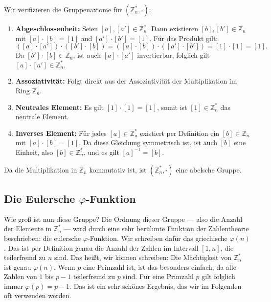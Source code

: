 \begin{math-stroke}

\begin{short-proof}
Wir verifizieren die Gruppenaxiome für $(\mathbb{Z}_n^*, \cdot)$:
\begin{enumerate}[label=\textbf{(\arabic*)}]
    \item \textbf{Abgeschlossenheit:} Seien $[a], [a'] \in \mathbb{Z}_n^*$. Dann existieren $[b], [b'] \in \mathbb{Z}_n$ mit $[a] \cdot [b] = [1]$ and $[a'] \cdot [b'] = [1]$. Für das Produkt gilt:
    \[
    ([a] \cdot [a']) \cdot ([b'] \cdot [b]) = ([a] \cdot [b]) \cdot ([a'] \cdot [b']) = [1] \cdot [1] = [1].
    \]
    Da $[b'] \cdot [b] \in \mathbb{Z}_n$, ist auch $[a] \cdot [a']$ invertierbar, folglich gilt $[a] \cdot [a'] \in \mathbb{Z}_n^*$.
    \item \textbf{Assoziativität:} Folgt direkt aus der Assoziativität der Multiplikation im Ring $\mathbb{Z}_n$.
    \item \textbf{Neutrales Element:} Es gilt $[1] \cdot [1] = [1]$, somit ist $[1] \in \mathbb{Z}_n^*$ das neutrale Element.
    \item \textbf{Inverses Element:} Für jedes $[a] \in \mathbb{Z}_n^*$ existiert per Definition ein $[b] \in \mathbb{Z}_n$ mit $[a] \cdot [b] = [1]$. Da diese Gleichung symmetrisch ist, ist auch $[b]$ eine Einheit, also $[b] \in \mathbb{Z}_n^*$, und es gilt $[a]^{-1} = [b]$.
\end{enumerate}
Da die Multiplikation in $\mathbb{Z}_n$ kommutativ ist, ist $(\mathbb{Z}_n^*, \cdot)$ eine abelsche Gruppe.
\end{short-proof}
\end{math-stroke}

\subsection{Die Eulersche \texorpdfstring{$\varphi$}{phi}-Funktion}

\begin{spoken-clean}[00:36:01 - 00:38:56]
Wie groß ist nun diese Gruppe? Die Ordnung dieser Gruppe --- also die Anzahl der Elemente in $\mathbb{Z}_n^*$ --- wird durch eine sehr berühmte Funktion der Zahlentheorie beschrieben: die eulersche $\varphi$-Funktion. Wir schreiben dafür das griechische $\varphi(n)$. Das ist per Definition genau die Anzahl der Zahlen im Intervall $[1, n]$, die teilerfremd zu $n$ sind. Das heißt, wir können schreiben: Die Mächtigkeit von $\mathbb{Z}_n^*$ ist genau $\varphi(n)$. Wenn $p$ eine Primzahl ist, ist das besonders einfach, da alle Zahlen von $1$ bis $p-1$ teilerfremd zu $p$ sind. Für eine Primzahl $p$ gilt folglich immer $\varphi(p) = p - 1$. Das ist ein sehr schönes Ergebnis, das wir im Folgenden oft verwenden werden.
\end{spoken-clean}

